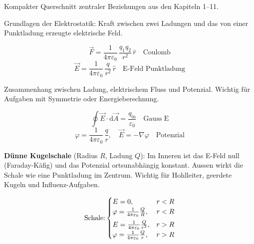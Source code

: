 

\begin{runintext}
Kompakter Querschnitt zentraler Beziehungen aus den Kapiteln 1--11.
\end{runintext}

\begin{runintext}
Grundlagen der Elektrostatik: Kraft zwischen zwei Ladungen und das von einer Punktladung erzeugte elektrische Feld.
\end{runintext}
\begin{formulabox}
\[ \vec{F} = \frac{1}{4\pi\varepsilon_0}\,\frac{q_1 q_2}{r^2}\,\hat{r} \quad \text{Coulomb} \]
\formulasep
\[ \vec{E} = \frac{1}{4\pi\varepsilon_0}\,\frac{q}{r^2}\,\hat{r} \quad \text{E-Feld Punktladung} \]
\end{formulabox}

\begin{runintext}
Zusammenhang zwischen Ladung, elektrischem Fluss und Potenzial. Wichtig für Aufgaben mit Symmetrie oder Energieberechnung.
\end{runintext}
\begin{formulabox}
\[ \oint \vec{E}\cdot\mathrm{d}\vec{A} = \frac{q_{\mathrm{in}}}{\varepsilon_0} \quad \text{Gauss E} \]
\formulasep
\[ \varphi = \frac{1}{4\pi\varepsilon_0}\,\frac{q}{r}, \quad \vec{E} = -\nabla\varphi \quad \text{Potenzial} \]
\end{formulabox}

\begin{runintext}
\textbf{Dünne Kugelschale} (Radius $R$, Ladung $Q$): Im Inneren ist das E-Feld null (Faraday-Käfig) und das Potenzial ortsunabhängig konstant. Aussen wirkt die Schale wie eine Punktladung im Zentrum. Wichtig für Hohlleiter, geerdete Kugeln und Influenz-Aufgaben.
\end{runintext}
\begin{formulabox}
\[
\text{Schale:} \begin{cases}
E = 0, \hfill & r < R \\
\varphi = \frac{1}{4\pi\varepsilon_0}\frac{Q}{R}, \hfill & r < R \\[1ex]
E = \frac{1}{4\pi\varepsilon_0}\frac{Q}{r^2}, \hfill & r > R \\
\varphi = \frac{1}{4\pi\varepsilon_0}\frac{Q}{r}, \hfill & r > R
\end{cases}
\]
\end{formulabox}

